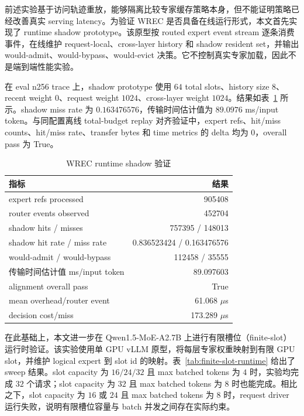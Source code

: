 前述实验基于访问轨迹重放，能够隔离比较专家缓存策略本身，但不能证明策略已经改善真实 serving latency。为验证 WREC 是否具备在线运行形式，本文首先实现了 runtime shadow prototype。该原型按 routed expert event stream 逐条消费事件，在线维护 request-local、cross-layer history 和 shadow resident set，并输出 would-admit、would-bypass、would-evict 决策。它不控制真实专家加载，因此不是端到端性能实验。

在 eval n256 trace 上，shadow prototype 使用 $64$ total slots、history size $8$、recent weight $0$、request weight $1024$、cross-layer weight $1024$。结果如表~\ref{tab:runtime-shadow} 所示。shadow miss rate 为 $0.163476576$，传输时间估计值为 $89.0976$ ms/input token。与同配置离线 total-budget replay 对齐验证中，expert refs、hit/miss counts、hit/miss rate、transfer bytes 和 time metrics 的 delta 均为 $0$，overall pass 为 True。

\begin{table}[ht]
    \centering
    \caption{\label{tab:runtime-shadow}WREC runtime shadow 验证}
    \begin{tabularx}{\linewidth}{lr}
        \hline
        指标 & 结果 \\ \hline
        expert refs processed & 905408 \\ \hline
        router events observed & 452704 \\ \hline
        shadow hits / misses & 757395 / 148013 \\ \hline
        shadow hit rate / miss rate & 0.836523424 / 0.163476576 \\ \hline
        would-admit / would-bypass & 112458 / 35555 \\ \hline
        传输时间估计值 ms/input token & 89.097603 \\ \hline
        alignment overall pass & True \\ \hline
        mean overhead/router event & 61.068 $\mu$s \\ \hline
        decision cost/miss & 173.289 $\mu$s \\ \hline
    \end{tabularx}
\end{table}

在此基础上，本文进一步在 Qwen1.5-MoE-A2.7B 上进行有限槽位（finite-slot）运行时验证。该实验使用单 GPU vLLM 原型，将每层专家权重映射到有限 GPU slot，并维护 logical expert 到 slot id 的映射。表~\ref{tab:finite-slot-runtime} 给出了 sweep 结果。slot capacity 为 $16/24/32$ 且 max batched tokens 为 $4$ 时，实验均完成 $32$ 个请求；slot capacity 为 $32$ 且 max batched tokens 为 $8$ 时也能完成。相比之下，slot capacity 为 $16$ 或 $24$ 且 max batched tokens 为 $8$ 时，request driver 运行失败，说明有限槽位容量与 batch 并发之间存在实际约束。


